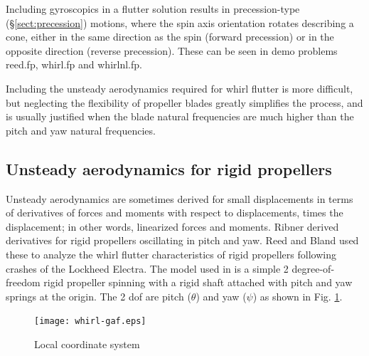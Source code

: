 \documentclass[11pt,openany,twoside]{book}
\numberwithin{equation}{section}		%
\newcommand{\Sectref}[1]{\S\ref{#1}}
\begin{document}
Including gyroscopics in a flutter solution results in
precession-type (\Sectref{sect:precession})
motions, where the spin axis orientation rotates describing a cone, either
in the same direction as the spin (forward precession) or in
the opposite direction (reverse precession). These can be seen in demo problems
reed.fp, whirl.fp and whirlnl.fp.

Including the unsteady
aerodynamics required for whirl flutter is more difficult, but
neglecting the flexibility of propeller blades greatly simplifies the process,
and is usually justified when the
blade natural frequencies are much higher than the pitch and yaw natural
frequencies.

\subsection{Unsteady aerodynamics for rigid propellers}\label{sect:whirl-aero}
\par
Unsteady aerodynamics are sometimes derived for small displacements
in terms of derivatives of forces and moments with respect to displacements,
times the displacement; in other words, linearized forces and moments.
Ribner \cite{ribner1943propellers} derived derivatives for rigid
propellers oscillating in pitch and yaw. Reed and Bland \cite{reed1961analytical}
used these to analyze the whirl flutter characteristics of rigid propellers
following crashes of the Lockheed Electra.
The model used in \cite{reed1961analytical} is a simple 2 degree-of-freedom
rigid propeller spinning with a rigid shaft attached with pitch and yaw
springs at the origin. The 2 dof are pitch ($\theta$) and yaw ($\psi$)
as shown in Fig. \ref{fig:whirl-gaf}.

\begin{figure}[hbt!]
	\texttt{[image: whirl-gaf.eps]}
\centering
\caption{Local coordinate system}\label{fig:whirl-gaf}
\end{figure}
\end{document}
